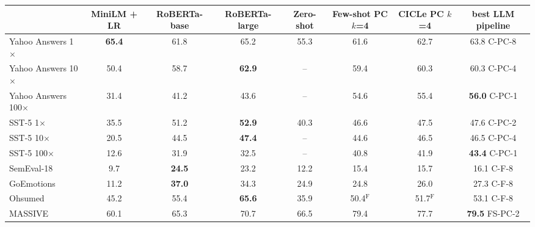 \begin{tabular}{lccccccc}
\toprule
 & MiniLM + LR & RoBERTa-base & RoBERTa-large & Zero-shot & Few-shot PC $k$=4 & CICLe PC $k$=4 & best LLM pipeline \\
\midrule
Yahoo Answers 1$\times$ & \textbf{65.4} & 61.8 & 65.2 & 55.3 & 61.6 & 62.7 & 63.8 {\scriptsize C-PC-8} \\
Yahoo Answers 10$\times$ & 50.4 & 58.7 & \textbf{62.9} & -- & 59.4 & 60.3 & 60.3 {\scriptsize C-PC-4} \\
Yahoo Answers 100$\times$ & 31.4 & 41.2 & 43.6 & -- & 54.6 & 55.4 & \textbf{56.0} {\scriptsize C-PC-1} \\
\midrule
SST-5 1$\times$ & 35.5 & 51.2 & \textbf{52.9} & 40.3 & 46.6 & 47.5 & 47.6 {\scriptsize C-PC-2} \\
SST-5 10$\times$ & 20.5 & 44.5 & \textbf{47.4} & -- & 44.6 & 46.5 & 46.5 {\scriptsize C-PC-4} \\
SST-5 100$\times$ & 12.6 & 31.9 & 32.5 & -- & 40.8 & 41.9 & \textbf{43.4} {\scriptsize C-PC-1} \\
\midrule
SemEval-18 & 9.7 & \textbf{24.5} & 23.2 & 12.2 & 15.4 & 15.7 & 16.1 {\scriptsize C-F-8} \\
GoEmotions & 11.2 & \textbf{37.0} & 34.3 & 24.9 & 24.8 & 26.0 & 27.3 {\scriptsize C-F-8} \\
Ohsumed & 45.2 & 55.4 & \textbf{65.6} & 35.9 & 50.4$^{\mathrm{F}}$ & 51.7$^{\mathrm{F}}$ & 53.1 {\scriptsize C-F-8} \\
MASSIVE & 60.1 & 65.3 & 70.7 & 66.5 & 79.4 & 77.7 & \textbf{79.5} {\scriptsize FS-PC-2} \\
\bottomrule
\end{tabular}
